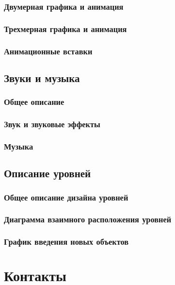 \documentclass{article}
\begin{document}
        \subsubsection{Двумерная графика и анимация}
        \subsubsection{Трехмерная графика и анимация}
        \subsubsection{Анимационные вставки}
    \subsection{Звуки и музыка}
        \subsubsection{Общее описание}
        \subsubsection{Звук и звуковые эффекты}
        \subsubsection{Музыка}
    \subsection{Описание уровней}
        \subsubsection{Общее описание дизайна уровней}
        \subsubsection{Диаграмма взаимного расположения уровней}
        \subsubsection{График введения новых объектов}

\section{Контакты}

\newpage
\end{document}
